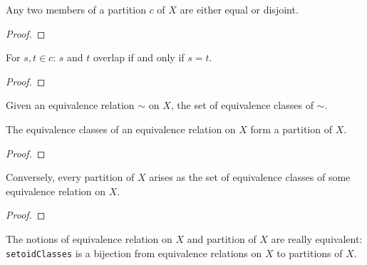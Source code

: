 \begin{proposition}
  \label{prop:prelims:partition-eq-or-disjoint}
  \leanok
  Any two members of a partition $c$ of $X$ are either equal or
  disjoint.
\end{proposition}
\begin{proof}
  \leanok
\end{proof}

\begin{proposition}
  \label{prop:prelims:partition-not-disjoint-iff-eq}
  \leanok
  For $s, t \in c$: $s$ and $t$ overlap if and only if $s = t$.
\end{proposition}
\begin{proof}
  \leanok
\end{proof}

\begin{definition}
  \label{def:prelims:setoid-classes}
  \leanok
  Given an equivalence relation $\sim$ on $X$, the set of equivalence
  classes of $\sim$.
\end{definition}

\begin{exercise}[I.1.2]
  \label{exer:prelims:1.2}
  \leanok
  The equivalence classes of an equivalence relation on $X$ form a
  partition of $X$.
\end{exercise}
\begin{proof}
  \leanok
\end{proof}

\begin{exercise}[I.1.3]
  \label{exer:prelims:1.3}
  \leanok
  Conversely, every partition of $X$ arises as the set of equivalence
  classes of some equivalence relation on $X$.
\end{exercise}
\begin{proof}
  \leanok
\end{proof}

\begin{proposition}
  \label{prop:prelims:bijective-setoid-classes}
  The notions of equivalence relation on $X$ and partition of $X$ are
  really equivalent: \texttt{setoidClasses} is a bijection from
  equivalence relations on $X$ to partitions of $X$.
\end{proposition}

